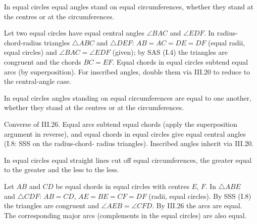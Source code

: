 \begin{claim}
\label{prop:III.26}
In equal circles equal angles stand on equal circumferences, whether
they stand at the centres or at the circumferences.
\end{claim}
\begin{evidence}
\label{ev:III.26}
Let two equal circles have equal central angles $\angle BAC$ and
$\angle EDF$.  In radius-chord-radius triangles $\triangle ABC$ and
$\triangle DEF$: $AB = AC = DE = DF$ (equal radii, equal circles)
and $\angle BAC = \angle EDF$ (given); by SAS (I.4) the triangles
are congruent and the chords $BC = EF$.  Equal chords in equal
circles subtend equal arcs (by superposition).  For inscribed
angles, double them via III.20 to reduce to the central-angle case.
\end{evidence}

\begin{claim}
\label{prop:III.27}
In equal circles angles standing on equal circumferences are equal to
one another, whether they stand at the centres or at the
circumferences.
\end{claim}
\begin{evidence}
\label{ev:III.27}
Converse of III.26.  Equal arcs subtend equal chords (apply the
superposition argument in reverse), and equal chords in equal
circles give equal central angles (I.8: SSS on the radius-chord-
radius triangles).  Inscribed angles inherit via III.20.
\end{evidence}

\begin{claim}
\label{prop:III.28}
In equal circles equal straight lines cut off equal circumferences,
the greater equal to the greater and the less to the less.
\end{claim}
\begin{evidence}
\label{ev:III.28}
Let $AB$ and $CD$ be equal chords in equal circles with centres $E$,
$F$.  In $\triangle ABE$ and $\triangle CDF$: $AB = CD$, $AE = BE
= CF = DF$ (radii, equal circles).  By SSS (I.8) the triangles are
congruent and $\angle AEB = \angle CFD$.  By III.26 the arcs are
equal.  The corresponding major arcs (complements in the equal
circles) are also equal.
\end{evidence}

